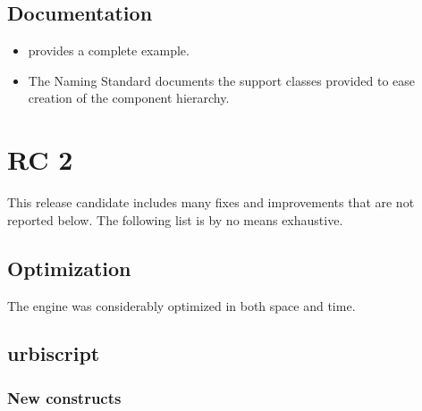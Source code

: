\subsection{Documentation}

\begin{itemize}
\item {} provides a complete example.
\item The Naming Standard documents the support classes provided to ease
  creation of the component hierarchy.
\end{itemize}

\section{ RC 2}

This release candidate includes many fixes and improvements that are
not reported below. The following list is by no means exhaustive.

\subsection{Optimization}

The \us engine was considerably optimized in both space and
time.

\subsection{urbiscript}

\subsubsection{New constructs}

